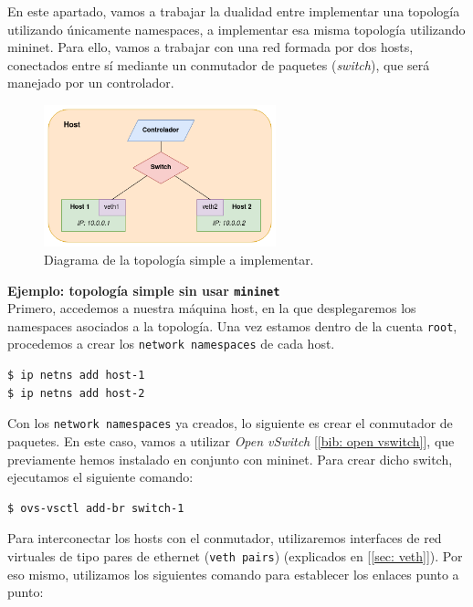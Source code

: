 \documentclass[a4paper, oneside, 12pt]{book}
\begin{document}
	\noindent En este apartado, vamos a trabajar la dualidad entre implementar una topología utilizando únicamente namespaces, a implementar esa misma topología utilizando mininet. Para ello, vamos a trabajar con una red formada por dos hosts, conectados entre sí mediante un conmutador de paquetes (\textit{switch}), que será manejado por un controlador. \\
	
	\begin{figure}[h!]
		\begin{center}
			\includegraphics[width=0.6\textwidth]{img/ns_mn_single.png}
			\caption{Diagrama de la topología simple a implementar.}
		\end{center}
	\end{figure}
	
	\noindent \textbf{\large Ejemplo: topología simple sin usar \texttt{mininet}}\\
	
	\noindent Primero, accedemos a nuestra máquina host, en la que desplegaremos los namespaces asociados a la topología. Una vez estamos dentro de la cuenta \texttt{root}, procedemos a crear los \texttt{network namespaces} de cada host. 
	
	\begin{verbatim}
$ ip netns add host-1
$ ip netns add host-2
	\end{verbatim}

	\noindent Con los \texttt{network namespaces} ya creados, lo siguiente es crear el conmutador de paquetes. En este caso, vamos a utilizar \textit{Open vSwitch} [\ref{bib: open vswitch}], que previamente hemos instalado en conjunto con mininet. Para crear dicho switch, ejecutamos el siguiente comando:
	
	\begin{verbatim}
$ ovs-vsctl add-br switch-1
	\end{verbatim}

	\noindent Para interconectar los hosts con el conmutador, utilizaremos interfaces de red virtuales de tipo pares de ethernet (\texttt{veth pairs}) (explicados en [\ref{sec: veth}]). Por eso mismo, utilizamos los siguientes comando para establecer los enlaces punto a punto:
	
\end{document}
